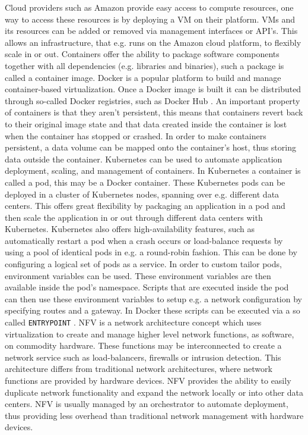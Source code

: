 Cloud providers such as Amazon provide easy access to compute resources, one way to access these resources is by deploying a VM on their platform. VMs and its resources can be added or removed via management interfaces or API's. This allows an infrastructure, that e.g. runs on the Amazon cloud platform, to flexibly scale in or out. Containers offer the ability to package software components together with all dependencies (e.g. libraries and binaries), such a package is called a container image. Docker is a popular platform to build and manage container-based virtualization. Once a Docker image is built it can be distributed through so-called Docker registries, such as Docker Hub \cite{dockerhub-website}. An important property of containers is that they aren't persistent, this means that containers revert back to their original image state and that data created inside the container is lost when the container has stopped or crashed. In order to make containers persistent, a data volume can be mapped onto the container's host, thus storing data outside the container. Kubernetes \cite{kubernetes-website} can be used to automate application deployment, scaling, and management of containers. In Kubernetes a container is called a pod, this may be a Docker container. These Kubernetes pods can be deployed in a cluster of Kubernetes nodes, spanning over e.g. different data centers. This offers great flexibility by packaging an application in a pod and then scale the application in or out through different data centers with Kubernetes. Kubernetes also offers high-availability features, such as automatically restart a pod when a crash occurs or load-balance requests by using a pool of identical pods in e.g. a round-robin fashion. This can be done by configuring a logical set of pods as a service. In order to custom tailor pods, environment variables can be used. These environment variables are then available inside the pod's namespace. Scripts that are executed inside the pod can then use these environment variables to setup e.g. a network configuration by specifying routes and a gateway. In Docker these scripts can be executed via a so called \texttt{ENTRYPOINT} \cite{dockerfile-reference}. NFV is a network architecture concept which uses virtualization to create and manage higher level network functions, as software, on commodity hardware. These functions may be interconnected to create a network service such as load-balancers, firewalls or intrusion detection. This architecture differs from traditional network architectures, where network functions are provided by hardware devices. NFV provides the ability to easily duplicate network functionality and expand the network locally or into other data centers. NFV is usually managed by an orchestrator to automate deployment, thus providing less overhead than traditional network management with hardware devices.